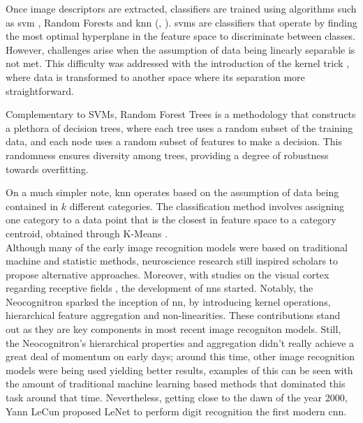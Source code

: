 \noindent Once image descriptors are extracted, classifiers are trained using algorithms such as 
\gls{svm} \autocite{cortes1995support}, Random Forests \autocite{ho1995random} and \gls{knn}
(\cite{cover1967nearest}, \cite{fix1989discriminatory}). \glspl{svm} are classifiers that operate 
by finding the most optimal hyperplane in the feature space to discriminate between classes. 
However, challenges arise when the assumption of data being linearly separable is not met. This 
difficulty was addressed with the introduction of the kernel trick \autocite{hofmann2008kernel}, 
where data is transformed to another space where its separation more straightforward.

Complementary to SVMs, Random Forest Trees is a methodology that constructs a plethora of decision 
trees, where each tree uses a random subset of the training data, and each node uses a random 
subset of features to make a decision. This randomness ensures diversity among trees, providing a 
degree of robustness towards overfitting.

On a much simpler note, \gls{knn} operates based on the assumption of data being contained in 
$k$ different categories. The classification method involves assigning one category to a data 
point that is the closest in feature space to a category centroid, obtained through K-Means 
\autocite{macqueen1967some}.\\

\noindent Although many of the early image recognition models were based on traditional machine 
and statistic methods, neuroscience research still inspired scholars to propose alternative 
approaches. Moreover, with studies on the visual cortex regarding receptive fields 
\autocite{hubel1959receptive}, the development of \glspl{nn} started. Notably, the 
Neocognitron \autocite{fukushima1975cognitron} sparked the inception of  \gls{nn}, by introducing 
kernel operations, hierarchical feature aggregation and non-linearities. These contributions stand 
out as they are key components in most recent image recogniton models.
Still, the Neocognitron's hierarchical properties and aggregation didn't really achieve 
a great deal of momentum on early days; around this time, other image recognition models were being 
used yielding better results, examples of this can be seen with the amount of traditional machine 
learning based methods that dominated this task around that time. Nevertheless, getting close to the 
dawn of the year 2000, Yann LeCun proposed LeNet to perform digit recognition 
\autocite{lecun1998gradient} the first modern \gls{cnn}.\\

